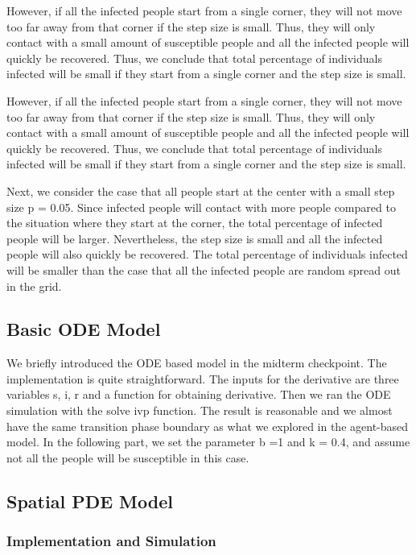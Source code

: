 \documentclass{article}
\begin{document}
However, if all the infected people start from a single corner, they will not move too far away from that corner if the step size is small. Thus, they will only contact with a small amount of susceptible people and all the infected people will quickly be recovered. Thus, we conclude that total percentage of individuals infected will be small if they start from a single corner and the step size is small.

However, if all the infected people start from a single corner, they will not move too far away from that corner if the step size is small. Thus, they will only contact with a small amount of susceptible people and all the infected people will quickly be recovered. Thus, we conclude that total percentage of individuals infected will be small if they start from a single corner and the step size is small.

Next, we consider the case that all people start at the center with a small step size p = 0.05. Since infected people will contact with more people compared to the situation where they start at the corner, the total percentage of infected people will be larger. Nevertheless, the step size is small and all the infected people will also quickly be recovered. The total percentage of individuals infected will be smaller than the case that all the infected people are random spread out in the grid.






\subsection{Basic ODE Model}

We briefly introduced the ODE based model in the midterm checkpoint. The implementation is quite straightforward. The inputs for the derivative are three variables s, i, r and a function for obtaining derivative. Then we ran the ODE simulation with the solve ivp function. The result is reasonable and we almost have the same transition phase boundary as what we explored in the agent-based model. In the following part, we set the parameter b =1 and k = 0.4, and assume not all the people will be susceptible in this case.



\subsection{Spatial PDE Model}

\subsubsection{Implementation and Simulation}
\end{document}
